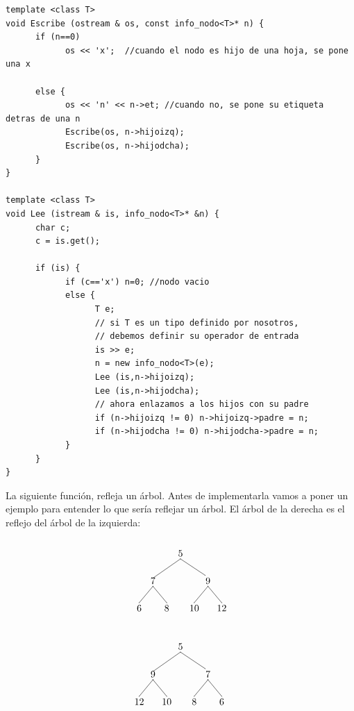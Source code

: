\documentclass[10pt,a4paper,spanish]{report}
\begin{document}
\begin{verbatim}
template <class T>
void Escribe (ostream & os, const info_nodo<T>* n) {
      if (n==0)
            os << 'x';  //cuando el nodo es hijo de una hoja, se pone una x

      else {
            os << 'n' << n->et; //cuando no, se pone su etiqueta detras de una n
            Escribe(os, n->hijoizq);
            Escribe(os, n->hijodcha);
      }
}

template <class T>
void Lee (istream & is, info_nodo<T>* &n) {
      char c;
      c = is.get();

      if (is) {
            if (c=='x') n=0; //nodo vacio
            else {
                  T e;
                  // si T es un tipo definido por nosotros,
                  // debemos definir su operador de entrada
                  is >> e;
                  n = new info_nodo<T>(e);
                  Lee (is,n->hijoizq);
                  Lee (is,n->hijodcha);
                  // ahora enlazamos a los hijos con su padre
                  if (n->hijoizq != 0) n->hijoizq->padre = n;
                  if (n->hijodcha != 0) n->hijodcha->padre = n;
            }
      }
}
\end{verbatim}

\noindent
La siguiente función, refleja un árbol. Antes de implementarla vamos a poner un ejemplo para entender lo que sería reflejar un árbol. El árbol de la derecha es el reflejo del árbol de la izquierda:


\begin{minipage}{0.5\textwidth}
\begin{flushleft}
\[\begin{xy}
,(0,0)*+=<10mm>[]\txt<2cm>{5}
,(-10,-10)*+=<10mm>[]\txt<2cm>{7}
,(10,-10)*+=<10mm>[]\txt<2cm>{9}
,(-15,-20)*+=<10mm>[]\txt<2cm>{6}
,(-5,-20)*+=<10mm>[]\txt<2cm>{8}
,(5,-20)*+=<10mm>[]\txt<2cm>{10}
,(15,-20)*+=<10mm>[]\txt<2cm>{12}

\ar@{-} (0,-2);(-10,-9)
\ar@{-} (0,-2);(9,-8)
\ar@{-} (-10,-12);(-15,-18)
\ar@{-} (10,-12);(5,-18)
\ar@{-} (10,-12);(15,-18)
\ar@{-} (-10,-12);(-5,-18)
\end{xy}\]
\end{flushleft}
\end{minipage}
\begin{minipage}{0.5\textwidth}
\begin{flushright}
\[\begin{xy}
,(0,0)*+=<10mm>[]\txt<2cm>{5}
,(-10,-10)*+=<10mm>[]\txt<2cm>{9}
,(10,-10)*+=<10mm>[]\txt<2cm>{7}
,(-15,-20)*+=<10mm>[]\txt<2cm>{12}
,(-5,-20)*+=<10mm>[]\txt<2cm>{10}
,(5,-20)*+=<10mm>[]\txt<2cm>{8}
,(15,-20)*+=<10mm>[]\txt<2cm>{6}

\ar@{-} (0,-2);(-10,-9)
\ar@{-} (0,-2);(9,-8)
\ar@{-} (-10,-12);(-15,-18)
\ar@{-} (10,-12);(5,-18)
\ar@{-} (10,-12);(15,-18)
\ar@{-} (-10,-12);(-5,-18)
\end{xy}\]
\end{flushright}
\end{minipage}
\end{document}
